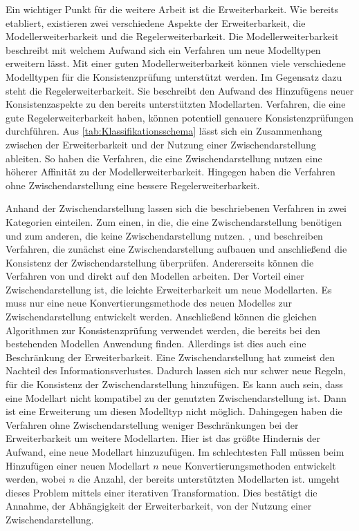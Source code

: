 Ein wichtiger Punkt für die weitere Arbeit ist die Erweiterbarkeit.
Wie bereits etabliert, existieren zwei verschiedene Aspekte der Erweiterbarkeit, die Modellerweiterbarkeit und die Regelerweiterbarkeit.
Die Modellerweiterbarkeit beschreibt mit welchem Aufwand sich ein Verfahren um neue Modelltypen erweitern lässt.
Mit einer guten Modellerweiterbarkeit können viele verschiedene Modelltypen für die Konsistenzprüfung unterstützt werden.
Im Gegensatz dazu steht die Regelerweiterbarkeit.
Sie beschreibt den Aufwand des Hinzufügens neuer Konsistenzaspekte zu den bereits unterstützten Modellarten.
Verfahren, die eine gute Regelerweiterbarkeit haben, können potentiell genauere Konsistenzprüfungen durchführen.
Aus \cref{tab:Klassifikationsschema} lässt sich ein Zusammenhang zwischen der Erweiterbarkeit und der Nutzung einer Zwischendarstellung ableiten.
So haben die Verfahren, die eine Zwischendarstellung nutzen eine höherer Affinität zu der Modellerweiterbarkeit.
Hingegen haben die Verfahren ohne Zwischendarstellung eine bessere Regelerweiterbarkeit.

Anhand der Zwischendarstellung lassen sich die beschriebenen Verfahren in zwei Kategorien einteilen.
Zum einen, in die, die eine Zwischendarstellung benötigen und zum anderen, die keine Zwischendarstellung nutzen.
\cite{Rasch2003}, \cite{Shinkawa2006} und \cite{Mens2005} beschreiben Verfahren, die zunächst eine Zwischendarstellung aufbauen und anschließend die Konsistenz der Zwischendarstellung überprüfen.
Andererseits können die Verfahren von \cite{Egyed2001} und \cite{Egyed2006} direkt auf den Modellen arbeiten.
Der Vorteil einer Zwischendarstellung ist, die leichte Erweiterbarkeit um neue Modellarten.
Es muss nur eine neue Konvertierungsmethode des neuen Modelles zur Zwischendarstellung entwickelt werden.
Anschließend können die gleichen Algorithmen zur Konsistenzprüfung verwendet werden, die bereits bei den bestehenden Modellen Anwendung finden.
Allerdings ist dies auch eine Beschränkung der Erweiterbarkeit.
Eine Zwischendarstellung hat zumeist den Nachteil des Informationsverlustes.
Dadurch lassen sich nur schwer neue Regeln, für die Konsistenz der Zwischendarstellung hinzufügen.
Es kann auch sein, dass eine Modellart nicht kompatibel zu der genutzten Zwischendarstellung ist.
Dann ist eine Erweiterung um diesen Modelltyp nicht möglich.
Dahingegen haben die Verfahren ohne Zwischendarstellung weniger Beschränkungen bei der Erweiterbarkeit um weitere Modellarten.
Hier ist das größte Hindernis der Aufwand, eine neue Modellart hinzuzufügen.
Im schlechtesten Fall müssen beim Hinzufügen einer neuen Modellart $n$ neue Konvertierungsmethoden entwickelt werden, wobei $n$ die Anzahl, der bereits unterstützten Modellarten ist.
\cite{Egyed2001} umgeht dieses Problem mittels einer iterativen Transformation.
Dies bestätigt die Annahme, der Abhängigkeit der Erweiterbarkeit, von der Nutzung einer Zwischendarstellung.

